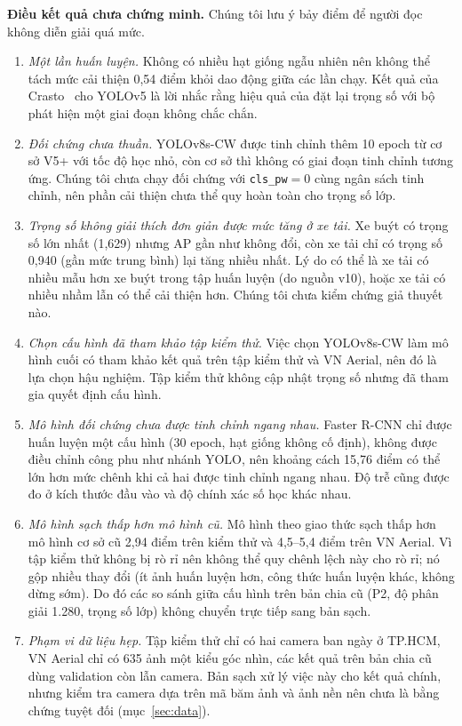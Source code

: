 \documentclass[10pt,journal,letterpaper]{IEEEtran}
\begin{document}
\textbf{Điều kết quả chưa chứng minh.} Chúng tôi lưu ý bảy điểm để người đọc không diễn giải quá mức.
\begin{enumerate}
\item \emph{Một lần huấn luyện.} Không có nhiều hạt giống ngẫu nhiên nên không thể tách mức cải thiện 0,54 điểm khỏi dao động giữa các lần chạy. Kết quả của Crasto~\cite{crasto} cho YOLOv5 là lời nhắc rằng hiệu quả của đặt lại trọng số với bộ phát hiện một giai đoạn không chắc chắn.
\item \emph{Đối chứng chưa thuần.} YOLOv8s-CW được tinh chỉnh thêm 10 epoch từ cơ sở V5+ với tốc độ học nhỏ, còn cơ sở thì không có giai đoạn tinh chỉnh tương ứng. Chúng tôi chưa chạy đối chứng với \texttt{cls\_pw}$=0$ cùng ngân sách tinh chỉnh, nên phần cải thiện chưa thể quy hoàn toàn cho trọng số lớp.
\item \emph{Trọng số không giải thích đơn giản được mức tăng ở xe tải.} Xe buýt có trọng số lớn nhất (1,629) nhưng AP gần như không đổi, còn xe tải chỉ có trọng số 0,940 (gần mức trung bình) lại tăng nhiều nhất. Lý do có thể là xe tải có nhiều mẫu hơn xe buýt trong tập huấn luyện (do nguồn v10), hoặc xe tải có nhiều nhầm lẫn có thể cải thiện hơn. Chúng tôi chưa kiểm chứng giả thuyết nào.
\item \emph{Chọn cấu hình đã tham khảo tập kiểm thử.} Việc chọn YOLOv8s-CW làm mô hình cuối có tham khảo kết quả trên tập kiểm thử và VN Aerial, nên đó là lựa chọn hậu nghiệm. Tập kiểm thử không cập nhật trọng số nhưng đã tham gia quyết định cấu hình.
\item \emph{Mô hình đối chứng chưa được tinh chỉnh ngang nhau.} Faster R-CNN chỉ được huấn luyện một cấu hình (30 epoch, hạt giống không cố định), không được điều chỉnh công phu như nhánh YOLO, nên khoảng cách 15,76 điểm có thể lớn hơn mức chênh khi cả hai được tinh chỉnh ngang nhau. Độ trễ cũng được đo ở kích thước đầu vào và độ chính xác số học khác nhau.
\item \emph{Mô hình sạch thấp hơn mô hình cũ.} Mô hình theo giao thức sạch thấp hơn mô hình cơ sở cũ 2,94 điểm trên kiểm thử và 4,5--5,4 điểm trên VN Aerial. Vì tập kiểm thử không bị rò rỉ nên không thể quy chênh lệch này cho rò rỉ; nó gộp nhiều thay đổi (ít ảnh huấn luyện hơn, công thức huấn luyện khác, không dừng sớm). Do đó các so sánh giữa cấu hình trên bản chia cũ (P2, độ phân giải 1.280, trọng số lớp) không chuyển trực tiếp sang bản sạch.
\item \emph{Phạm vi dữ liệu hẹp.} Tập kiểm thử chỉ có hai camera ban ngày ở TP.HCM, VN Aerial chỉ có 635 ảnh một kiểu góc nhìn, các kết quả trên bản chia cũ dùng validation còn lẫn camera. Bản sạch xử lý việc này cho kết quả chính, nhưng kiểm tra camera dựa trên mã băm ảnh và ảnh nền nên chưa là bằng chứng tuyệt đối (mục~\ref{sec:data}).
\end{enumerate}
\end{document}
